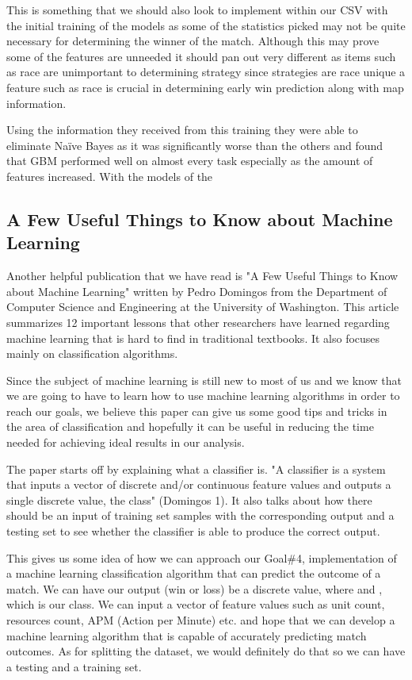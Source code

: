 \documentclass[a4paper,12pt]{report}
\begin{document}
This is something that we should also look to implement within our CSV with the initial training of the models as some of the statistics picked may not be quite necessary for determining the winner of the match. Although this may prove some of the features are unneeded it should pan out very different as items such as race are unimportant to determining strategy since strategies are race unique a feature such as race is crucial in determining early win prediction along with map information.

Using the information they received from this training they were able to eliminate Naïve Bayes as it was significantly worse than the others and found that GBM performed well on almost every task especially as the amount of features increased. With the models of the

\subsection{A Few Useful Things to Know about Machine Learning}

Another helpful publication that we have read is "A Few Useful Things to Know about Machine Learning" written by Pedro Domingos from the Department of Computer Science and Engineering at the University of Washington. This article summarizes 12 important lessons that other researchers have learned regarding machine learning that is hard to find in traditional textbooks. It also focuses mainly on classification algorithms. 

Since the subject of machine learning is still new to most of us and we know that we are going to have to learn how to use machine learning algorithms in order to reach our goals, we believe this paper can give us some good tips and tricks in the area of classification and hopefully it can be useful in reducing the time needed for achieving ideal results in our analysis.

The paper starts off by explaining what a classifier is. "A classifier is a system that inputs a vector of discrete and/or continuous feature values and outputs a single discrete value, the class" (Domingos 1). It also talks about how there should be an input of training set samples with the corresponding output and a testing set to see whether the classifier is able to produce the correct output.

This gives us some idea of how we can approach our Goal\#4, implementation of a machine learning classification algorithm that can predict the outcome of a match. We can have our output (win or loss) be a discrete value, where  and , which is our class. We can input a vector of feature values such as unit count, resources count, APM (Action per Minute) etc. and hope that we can develop a machine learning algorithm that is capable of accurately predicting match outcomes. As for splitting the dataset, we would definitely do that so we can have a testing and a training set.
\end{document}
